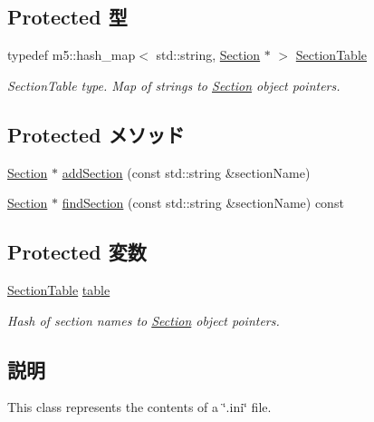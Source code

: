 \subsection*{Protected 型}
\begin{DoxyCompactItemize}
\item 
typedef m5::hash\_\-map$<$ std::string, \hyperlink{classIniFile_1_1Section}{Section} $\ast$ $>$ \hyperlink{classIniFile_a7f866c6d9bf26c09923718bbfb02353d}{SectionTable}
\begin{DoxyCompactList}\small\item\em SectionTable type. Map of strings to \hyperlink{classIniFile_1_1Section}{Section} object pointers. \item\end{DoxyCompactList}\end{DoxyCompactItemize}
\subsection*{Protected メソッド}
\begin{DoxyCompactItemize}
\item 
\hyperlink{classIniFile_1_1Section}{Section} $\ast$ \hyperlink{classIniFile_a482706394c2a427dca9f470a011435f0}{addSection} (const std::string \&sectionName)
\item 
\hyperlink{classIniFile_1_1Section}{Section} $\ast$ \hyperlink{classIniFile_a657c22f264ee81153a6d1a3c75ef0e76}{findSection} (const std::string \&sectionName) const 
\end{DoxyCompactItemize}
\subsection*{Protected 変数}
\begin{DoxyCompactItemize}
\item 
\hyperlink{classIniFile_a7f866c6d9bf26c09923718bbfb02353d}{SectionTable} \hyperlink{classIniFile_a18f6b167674b894900920b9e540d3535}{table}
\begin{DoxyCompactList}\small\item\em Hash of section names to \hyperlink{classIniFile_1_1Section}{Section} object pointers. \item\end{DoxyCompactList}\end{DoxyCompactItemize}


\subsection{説明}
This class represents the contents of a \char`\"{}.ini\char`\"{} file.

